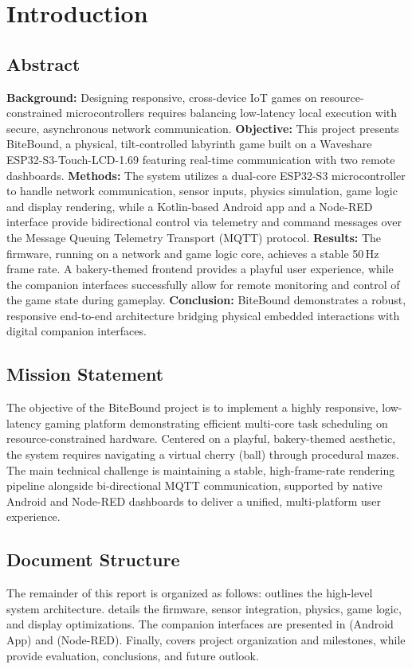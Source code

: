 \section{Introduction}
\label{sec:introduction}

\subsection{Abstract}
\label{subsec:abstract}
\textbf{Background:} Designing responsive, cross-device IoT games on resource-constrained microcontrollers requires balancing low-latency local execution with secure, asynchronous network communication.
\textbf{Objective:} This project presents BiteBound, a physical, tilt-controlled labyrinth game built on a Waveshare ESP32-S3-Touch-LCD-1.69 featuring real-time communication with two remote dashboards.
\textbf{Methods:} The system utilizes a dual-core ESP32-S3 microcontroller to handle network communication, sensor inputs, physics simulation, game logic and display rendering, while a Kotlin-based Android app and a Node-RED interface provide bidirectional control via telemetry and command messages over the Message Queuing Telemetry Transport (MQTT) protocol.
\textbf{Results:} The firmware, running on a network and game logic core, achieves a stable 50\,Hz frame rate. A bakery-themed frontend provides a playful user experience, while the companion interfaces successfully allow for remote monitoring and control of the game state during gameplay.
\textbf{Conclusion:} BiteBound demonstrates a robust, responsive end-to-end architecture bridging physical embedded interactions with digital companion interfaces.

\subsection{Mission Statement}
\label{subsec:mission_statement}
The objective of the BiteBound project is to implement a highly responsive, low-latency gaming platform demonstrating efficient multi-core task scheduling on resource-constrained hardware. Centered on a playful, bakery-themed aesthetic, the system requires navigating a virtual cherry (ball) through procedural mazes. The main technical challenge is maintaining a stable, high-frame-rate rendering pipeline alongside bi-directional MQTT communication, supported by native Android and Node-RED dashboards to deliver a unified, multi-platform user experience.

\subsection{Document Structure}
\label{subsec:document_structure}
The remainder of this report is organized as follows:
 outlines the high-level system architecture.
 details the firmware, sensor integration, physics, game logic, and display optimizations.
The companion interfaces are presented in  (Android App) and  (Node-RED).
Finally,  covers project organization and milestones, while  provide evaluation, conclusions, and future outlook.
